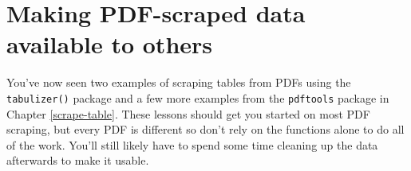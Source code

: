 \documentclass[
]{krantz}
\makeatletter
\newenvironment{Shaded}{\begin{snugshade}}{\end{snugshade}}
\newcommand{\AttributeTok}[1]{\textcolor[rgb]{0.61,0.61,0.61}{#1}}
\newcommand{\CommentTok}[1]{\textcolor[rgb]{0.37,0.37,0.37}{\textit{#1}}}
\newcommand{\ConstantTok}[1]{\textcolor[rgb]{0,0,0}{#1}}
\newcommand{\FunctionTok}[1]{\textcolor[rgb]{0,0,0}{#1}}
\newcommand{\NormalTok}[1]{#1}
\newcommand{\OtherTok}[1]{\textcolor[rgb]{0.37,0.37,0.37}{#1}}
\newcommand{\SpecialCharTok}[1]{\textcolor[rgb]{0,0,0}{#1}}
\newcommand{\StringTok}[1]{\textcolor[rgb]{0.5,0.5,0.5}{#1}}
\newenvironment{kframe}{%
\medskip{}
\setlength{\fboxsep}{.8em}
 \def\at@end@of@kframe{}%
 \ifinner\ifhmode%
  \def\at@end@of@kframe{\end{minipage}}%
  \begin{minipage}{\columnwidth}%
 \fi\fi%
 \def\FrameCommand##1{\hskip\@totalleftmargin \hskip-\fboxsep
 \colorbox{shadecolor}{##1}\hskip-\fboxsep
     \hskip-\linewidth \hskip-\@totalleftmargin \hskip\columnwidth}%
 \MakeFramed {\advance\hsize-\width
   \@totalleftmargin\z@ \linewidth\hsize
   \@setminipage}}%
 {\par\unskip\endMakeFramed%
 \at@end@of@kframe}
\renewenvironment{Shaded}{\begin{kframe}}{\end{kframe}}
\makeatother
\begin{document}
\begin{Shaded}
\end{Shaded}

\hypertarget{making-pdf-scraped-data-available-to-others}{%
\section{Making PDF-scraped data available to others}\label{making-pdf-scraped-data-available-to-others}}

You've now seen two examples of scraping tables from PDFs using the \texttt{tabulizer()} package and a few more examples from the \texttt{pdftools} package in Chapter \ref{scrape-table}. These lessons should get you started on most PDF scraping, but every PDF is different so don't rely on the functions alone to do all of the work. You'll still likely have to spend some time cleaning up the data afterwards to make it usable.
\end{document}

